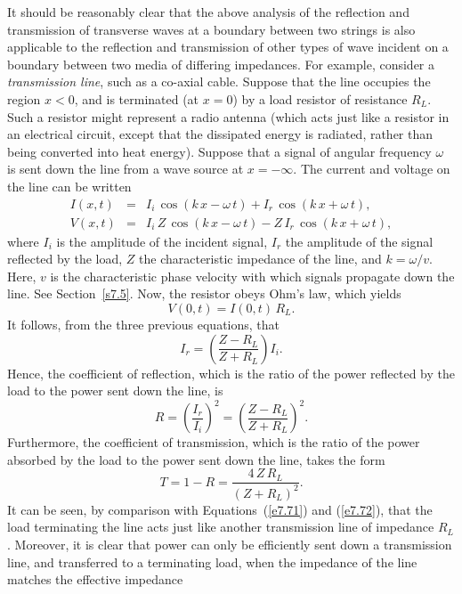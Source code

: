 It should be reasonably clear that the above analysis of the reflection and transmission of
transverse waves at a boundary between two strings is also applicable to the reflection
and transmission of other types of wave incident on a boundary between two media of
differing impedances. For example, consider  a {\em transmission line}, such
as a co-axial cable. Suppose that the line occupies the region $x<0$, and is
terminated (at $x=0$) by a load resistor of resistance $R_L$. Such a resistor might represent a
radio antenna (which acts just like a resistor in an electrical circuit, except that
the dissipated energy is radiated, rather than being converted into heat energy). 
Suppose that a signal of angular frequency $\omega$ is sent down the line
from a wave source at $x=-\infty$. The current and voltage on the line
can be written
\begin{eqnarray}
I(x,t) &=& I_i\,\cos(k\,x-\omega\,t) + I_r\,\cos(k\,x+\omega\,t),\\[0.5ex]
V(x,t) &=& I_i\,Z\,\cos(k\,x-\omega\,t) - Z\,I_r\,\cos(k\,x+\omega\,t),
\end{eqnarray}
where $I_i$ is the amplitude of the incident signal,  $I_r$ the amplitude
of the signal reflected by the load, $Z$ the characteristic impedance of the line, and $k=\omega/v$.
Here, $v$ is the characteristic phase velocity with which signals propagate down the line.
See Section~\ref{s7.5}. Now, the resistor obeys Ohm's law,
which yields
\begin{equation}
V(0,t) = I(0,t)\,R_L.
\end{equation}
It follows, from the three previous equations, that
\begin{equation}
I_r = \left(\frac{Z-R_L}{Z+R_L}\right) I_i.
\end{equation}
Hence, the coefficient of reflection, which is the ratio of the power reflected by the load to the power sent down the line, is
\begin{equation}
R = \left(\frac{I_r}{I_i}\right)^2=\left(\frac{Z-R_L}{Z+R_L}\right)^2.
\end{equation}
Furthermore, the coefficient of transmission, which is the ratio
of the power absorbed by the load to the power sent down the line, 
takes the form
\begin{equation}
T = 1-R = \frac{4\,Z\,R_L}{(Z+R_L)^2}.
\end{equation}
It can be seen, by comparison with Equations~(\ref{e7.71}) and (\ref{e7.72}),
that the load terminating the line acts just like another  transmission line of imped\-ance $R_L$. Moreover, it is clear that power can only be efficiently sent down a transmission line, and transferred to a terminating load, when the impedan\-ce of the line matches the effective impedance
